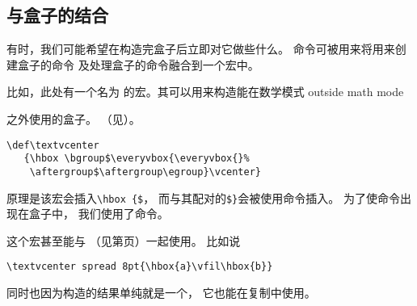 \documentclass{book}
\begin{document}
\subsection{与盒子的结合}

有时，我们可能希望在构造完盒子后立即对它做些什么。
命令可被用来将用来创建盒子的命令
及处理盒子的命令融合到一个宏中。

比如，此处有一个名为
\label{text:vcenter}
的宏。其可以用来构造能在数学模式
\howto {} outside math mode\par
之外使用的盒子。
（见\pageref{vcenter}\label{tvcenter}）。
\begin{verbatim}
\def\textvcenter
   {\hbox \bgroup$\everyvbox{\everyvbox{}%
    \aftergroup$\aftergroup\egroup}\vcenter}
\end{verbatim}
原理是该宏会插入\verb>\hbox {$>，
而与其配对的\verb>$}>会被使用命令插入。
为了使命令出现在盒子中，
我们使用了命令。

这个宏甚至能与
（见第\pageref{box:spec}页）一起使用。
比如说
\begin{verbatim}
\textvcenter spread 8pt{\hbox{a}\vfil\hbox{b}}
\end{verbatim}
同时也因为构造的结果单纯就是一个，
它也能在复制中使用。
\end{document}
